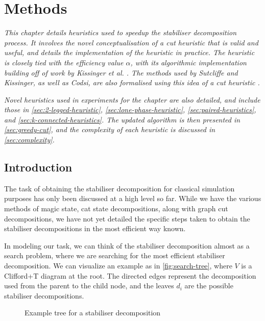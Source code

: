 \chapter{\label{ch:3-methods}Methods}

\minitoc

\textit{
    This chapter details heuristics used to speedup the stabiliser decomposition process.
    It involves the novel conceptualisation of a cut heuristic that is valid and useful,
    and details the implementation of the heuristic in practice.
    The heuristic is closely tied with the efficiency value $\alpha$,
    with its algorithmic implementation building off of work by Kissinger et al. \cite{Kissinger2022cat}.
    The methods used by Sutcliffe and Kissinger, as well as Codsi, are also formalised
    using this idea of a cut heuristic \cite{sutcliffe2024proccut,Codsi2022}.
}

\textit{
    Novel heuristics used in experiments for the  chapter are also detailed,
    and include those in \autoref{sec:2-legged-heuristic}, \ref{sec:lone-phase-heuristic},
    \ref{sec:paired-heuristics}, and \ref{sec:k-connected-heuristics}.
    The updated algorithm is then presented in \autoref{sec:greedy-cut},
    and the complexity of each heuristic is discussed in \autoref{sec:complexity}.
}

\section{Introduction}
The task of obtaining the stabiliser decomposition for classical simulation purposes
has only been discussed at a high level so far.
While we have the various methods of magic state, cat state decompositions, 
along with graph cut decompositions,
we have not yet detailed the specific steps taken to obtain the stabiliser decompositions
in the most efficient way known.

In modeling our task, we can think of the stabiliser decomposition almost as a search problem, 
where we are searching for the most efficient stabiliser decomposition.
We can visualize an example as in \autoref{fig:search-tree}, where $V$ is a Clifford+T diagram at the root.
The directed edges represent the decomposition used from the parent to the child node, 
and the leaves $d_i$ are the possible stabiliser decompositions.

\begin{figure}[h!]
\caption{Example tree for a stabiliser decomposition}
\label{fig:search-tree}
\end{figure}

